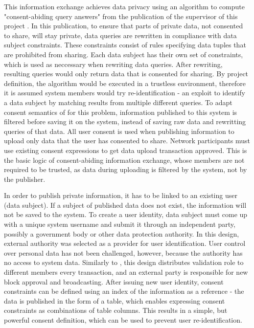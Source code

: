 \documentclass[12pt]{article}
\begin{document}
    This information exchange achieves data privacy using an algorithm to compute "consent-abiding query answers" from the publication of the supervisor of this project \cite{konstantinidis}. In this publication, to ensure that parts of private data, not consented to share, will stay private, data queries are rewritten in compliance with data subject constraints. These constraints consist of rules specifying data tuples that are prohibited from sharing. Each data subject has their own set of constraints, which is used as neccessary when rewriting data queries. After rewriting, resulting queries would only return data that is consented for sharing. By project definition, the algorithm would be executed in a trustless environment, therefore it is assumed system members would try re-identification - an exploit to identify a data subject by matching results from multiple different queries. To adapt consent semantics of \cite{konstantinidis} for this problem, information published to this system is filtered before saving it on the system, instead of saving raw data and rewritting queries of that data. All user consent is used when publishing information to upload only data that the user has consented to share. Network participants must use existing consent expressions to get data upload transaction approved. This is the basic logic of consent-abiding information exchange, whose members are not required to be trusted, as data during uploading is filtered by the system, not by the publisher.

    In order to publish private information, it has to be linked to an existing user (data subject). If a subject of published data does not exist, the information will not be saved to the system. To create a user identity, data subject must come up with a unique system username and submit it through an independent party, possibly a government body or other data protection authority. In this design, external authority was selected as a provider for user identification. User control over personal data has not been challenged, however, because the authority has no access to system data. Similarly to \cite{permissioned}, this design distributes validation role to different members every transaction, and an external party is responsible for new block approval and broadcasting. After issuing new user identity, consent constraints can be defined using an index of the information as a reference - the data is published in the form of a table, which enables expressing consent constraints as combinations of table columns. This results in a simple, but powerful consent definition, which can be used to prevent user re-identification.
\end{document}
